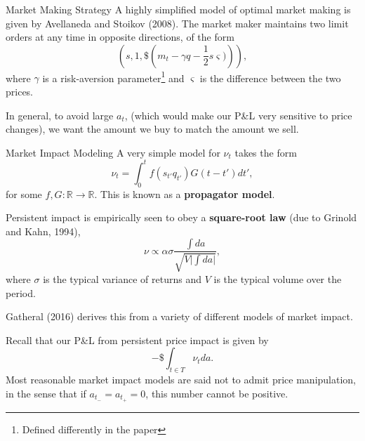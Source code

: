 \documentclass{beamer}
\begin{document}
\begin{frame}{Market Making Strategy}
	A highly simplified model of optimal market making is given by Avellaneda and Stoikov (2008). The market maker maintains two limit orders at any time in opposite directions, of the form
	$$\left(s, 1, \$\left(m_t - \gamma q - \frac{1}{2}s\varsigma)\right)\right),$$
	where $\gamma$ is a risk-aversion parameter\footnote{Defined differently in the paper} and $\varsigma$ is the difference between the two prices.

	In general, to avoid large $a_t$, (which would make our P\&L very sensitive to price changes), we want the amount we buy to match the amount we sell. %
\end{frame}

\begin{frame}{Market Impact Modeling}
	A very simple model for $\nu_t$ takes the form
	$$\nu_t = \int_0^t f(s_{t'}q_{t'})G(t-t')dt',$$
	for some $f,G:\mathbb{R}\to\mathbb{R}$. This is known as a \textbf{propagator model}.

	Persistent impact is empirically seen to obey a \textbf{square-root law} (due to Grinold and Kahn, 1994),
	$$\nu \propto \alpha\sigma\frac{\int da}{\sqrt{V \vert \int da\vert}},$$
	where $\sigma$ is the typical variance of returns and $V$ is the typical volume over the period.

	Gatheral (2016) derives this from a variety of different models of market impact.

	Recall that our P\&L from persistent price impact is given by 
	$$-\$\int_{t\in T} \nu_t da.$$
	Most reasonable market impact models are said not to admit price manipulation, in the sense that if $a_{t_-}=a_{t_+}=0$, this number cannot be positive.
\end{frame}
\end{document}
